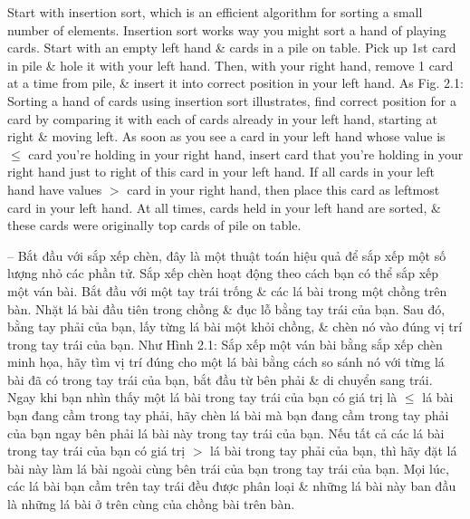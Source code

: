 \documentclass{article}
\begin{document}
\begin{itemize}
\begin{itemize}
\begin{itemize}
            Start with insertion sort, which is an efficient algorithm for sorting a small number of elements. Insertion sort works way you might sort a hand of playing cards. Start with an empty left hand \& cards in a pile on table. Pick up 1st card in pile \& hole it with your left hand. Then, with your right hand, remove 1 card at a time from pile, \& insert it into correct position in your left hand. As {\sf Fig. 2.1: Sorting a hand of cards using insertion sort} illustrates, find correct position for a card by comparing it with each of cards already in your left hand, starting at right \& moving left. As soon as you see a card in your left hand whose value is $\le$ card you're holding in your right hand, insert card that you're holding in your right hand just to right of this card in your left hand. If all cards in your left hand have values $>$ card in your right hand, then place this card as leftmost card in your left hand. At all times, cards held in your left hand are sorted, \& these cards were originally top cards of pile on table.
            
            -- Bắt đầu với sắp xếp chèn, đây là một thuật toán hiệu quả để sắp xếp một số lượng nhỏ các phần tử. Sắp xếp chèn hoạt động theo cách bạn có thể sắp xếp một ván bài. Bắt đầu với một tay trái trống \& các lá bài trong một chồng trên bàn. Nhặt lá bài đầu tiên trong chồng \& đục lỗ bằng tay trái của bạn. Sau đó, bằng tay phải của bạn, lấy từng lá bài một khỏi chồng, \& chèn nó vào đúng vị trí trong tay trái của bạn. Như {\sf Hình 2.1: Sắp xếp một ván bài bằng sắp xếp chèn} minh họa, hãy tìm vị trí đúng cho một lá bài bằng cách so sánh nó với từng lá bài đã có trong tay trái của bạn, bắt đầu từ bên phải \& di chuyển sang trái. Ngay khi bạn nhìn thấy một lá bài trong tay trái của bạn có giá trị là $\le$ lá bài bạn đang cầm trong tay phải, hãy chèn lá bài mà bạn đang cầm trong tay phải của bạn ngay bên phải lá bài này trong tay trái của bạn. Nếu tất cả các lá bài trong tay trái của bạn có giá trị $>$ lá bài trong tay phải của bạn, thì hãy đặt lá bài này làm lá bài ngoài cùng bên trái của bạn trong tay trái của bạn. Mọi lúc, các lá bài bạn cầm trên tay trái đều được phân loại \& những lá bài này ban đầu là những lá bài ở trên cùng của chồng bài trên bàn.
            

\end{itemize}
\end{itemize}
\end{itemize}
\end{document}
